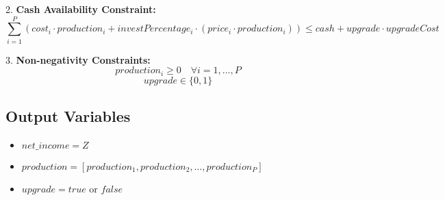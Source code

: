 \documentclass{article}
\begin{document}
2. \textbf{Cash Availability Constraint:}
\[
\sum_{i=1}^{P} (cost_i \cdot production_i + investPercentage_i \cdot (price_i \cdot production_i)) \leq cash + upgrade \cdot upgradeCost
\]

3. \textbf{Non-negativity Constraints:}
\[
production_i \geq 0 \quad \forall i = 1, \ldots, P
\]
\[
upgrade \in \{0, 1\}
\]

\subsection*{Output Variables}

\begin{itemize}
    \item \( net\_income = Z \)
    \item \( production = [production_1, production_2, \ldots, production_P] \)
    \item \( upgrade = true \text{ or } false \)
\end{itemize}
\end{document}
